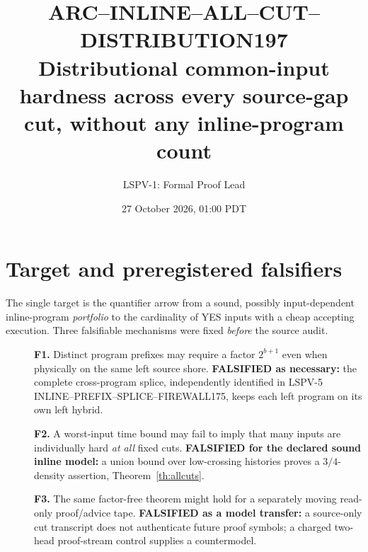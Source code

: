 \documentclass[11pt]{article}
\title{ARC--INLINE--ALL--CUT--DISTRIBUTION197\\
\large Distributional common-input hardness across every source-gap cut,
without any inline-program count}
\author{LSPV-1: Formal Proof Lead}
\date{27 October 2026, 01:00 PDT}
\begin{document}
\maketitle

\begin{center}
\end{center}

\section{Target and preregistered falsifiers}
The single target is the quantifier arrow from a sound, possibly
input-dependent inline-program \emph{portfolio} to the cardinality of
YES inputs with a cheap accepting execution. Three falsifiable
mechanisms were fixed \emph{before} the source audit.
\begin{description}
\item[]\textbf{F1.} Distinct program prefixes may require
a factor $2^{b+1}$ even when physically on the same left
source shore. \textbf{FALSIFIED as necessary:} the complete
cross-program splice, independently identified in LSPV-5
INLINE--PREFIX--SPLICE--FIREWALL175, keeps each left program
on its own left hybrid.
\item[]\textbf{F2.} A worst-input time bound may fail to imply
that many inputs are individually hard \emph{at all} fixed
cuts. \textbf{FALSIFIED for the declared sound inline model:}
a union bound over low-crossing histories proves a
$3/4$-density assertion, Theorem~\ref{th:allcuts}.
\item[]\textbf{F3.} The same factor-free theorem might hold
for a separately moving read-only proof/advice tape.
\textbf{FALSIFIED as a model transfer:} a source-only
cut transcript does not authenticate future proof symbols;
a charged two-head proof-stream control supplies a countermodel.
\end{description}
\end{document}
